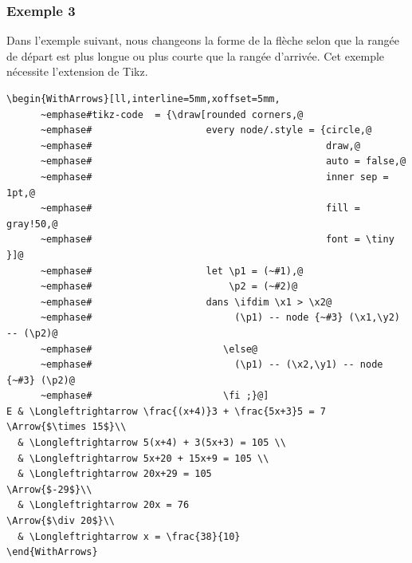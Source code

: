 \documentclass[dvipsnames]{article}%
\begin{document}
\begin{WithArrows}
\begin{WithArrows}[rr]
\bigskip
\subsubsection{Exemple 3}

Dans l'exemple suivant, nous changeons la forme de la flèche selon que la rangée de départ est plus longue ou
plus courte que la rangée d'arrivée. Cet exemple nécessite l'extension  de Tikz.


\begin{Verbatim}
\begin{WithArrows}[ll,interline=5mm,xoffset=5mm,
      ~emphase#tikz-code  = {\draw[rounded corners,@
      ~emphase#                    every node/.style = {circle,@
      ~emphase#                                         draw,@
      ~emphase#                                         auto = false,@
      ~emphase#                                         inner sep = 1pt,@
      ~emphase#                                         fill = gray!50,@
      ~emphase#                                         font = \tiny }]@ 
      ~emphase#                    let \p1 = (~#1),@
      ~emphase#                        \p2 = (~#2)@
      ~emphase#                    dans \ifdim \x1 > \x2@
      ~emphase#                         (\p1) -- node {~#3} (\x1,\y2) -- (\p2)@
      ~emphase#                       \else@
      ~emphase#                         (\p1) -- (\x2,\y1) -- node {~#3} (\p2)@
      ~emphase#                       \fi ;}@]
E & \Longleftrightarrow \frac{(x+4)}3 + \frac{5x+3}5 = 7 
\Arrow{$\times 15$}\\
  & \Longleftrightarrow 5(x+4) + 3(5x+3) = 105 \\
  & \Longleftrightarrow 5x+20 + 15x+9 = 105 \\
  & \Longleftrightarrow 20x+29 = 105 
\Arrow{$-29$}\\
  & \Longleftrightarrow 20x = 76 
\Arrow{$\div 20$}\\
  & \Longleftrightarrow x = \frac{38}{10} 
\end{WithArrows}
\end{Verbatim}



\end{WithArrows}
\end{WithArrows}
\end{document}

